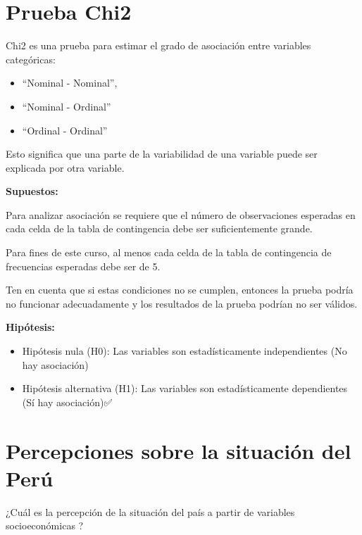 \documentclass[
]{article}
\begin{document}
\hypertarget{prueba-chi2}{%
\section{\texorpdfstring{\textbf{Prueba
Chi2}}{Prueba Chi2}}\label{prueba-chi2}}

Chi2 es una prueba para estimar el grado de asociación entre variables
categóricas:

\begin{itemize}
\item
  ``Nominal - Nominal'',
\item
  ``Nominal - Ordinal''
\item
  ``Ordinal - Ordinal''
\end{itemize}

Esto significa que una parte de la variabilidad de una variable puede
ser explicada por otra variable.

\textbf{Supuestos:}

Para analizar asociación se requiere que el número de observaciones
esperadas en cada celda de la tabla de contingencia debe ser
suficientemente grande.

Para fines de este curso, al menos cada celda de la tabla de
contingencia de frecuencias esperadas debe ser de 5.

Ten en cuenta que si estas condiciones no se cumplen, entonces la prueba
podría no funcionar adecuadamente y los resultados de la prueba podrían
no ser válidos.

\textbf{Hipótesis:}

\begin{itemize}
\item
  Hipótesis nula (H0): Las variables son estadísticamente independientes
  (No hay asociación) 🚫
\item
  Hipótesis alternativa (H1): Las variables son estadísticamente
  dependientes (Sí hay asociación)✅
\end{itemize}

\hypertarget{percepciones-sobre-la-situaciuxf3n-del-peruxfa}{%
\section{\texorpdfstring{\textbf{Percepciones sobre la situación del
Perú}}{Percepciones sobre la situación del Perú}}\label{percepciones-sobre-la-situaciuxf3n-del-peruxfa}}

¿Cuál es la percepción de la situación del país a partir de variables
socioeconómicas ? 🤔
\end{document}
